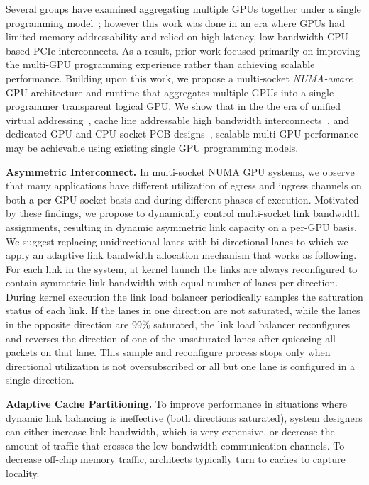 \documentclass{sig-alternate}
\begin{document}
Several groups have examined aggregating multiple GPUs together under 
a single programming model~\cite{lee2013transparent,Cabezas2015}; however this 
work was done in an era where GPUs had limited memory addressability and relied 
on high latency, low bandwidth CPU-based PCIe interconnects. As a result, prior work focused primarily on improving the multi-GPU programming experience rather than achieving scalable performance. Building upon this work, we propose a 
multi-socket \textit{NUMA-aware} GPU architecture and runtime that aggregates 
multiple GPUs into a single programmer transparent logical GPU. We show that in 
the the era of unified virtual addressing~\cite{UVM}, cache line addressable 
high bandwidth interconnects~\cite{NVLINK}, and dedicated GPU and CPU socket PCB 
designs~\cite{SierraHPC}, scalable multi-GPU performance may be achievable using 
existing single GPU programming models.


\textbf{Asymmetric Interconnect.} In multi-socket NUMA GPU systems, we observe that many applications have different utilization of egress and ingress channels on both a per GPU-socket basis and during different phases of execution. Motivated by these findings, we propose to dynamically control multi-socket link bandwidth assignments, resulting in dynamic asymmetric link capacity on a per-GPU basis. We suggest replacing unidirectional lanes with bi-directional lanes to which we apply an adaptive link bandwidth allocation mechanism that works as following. For each link in the system, at kernel launch the links are always reconfigured to contain symmetric link bandwidth with equal number of lanes per direction. During kernel execution the link load balancer periodically samples the saturation status of each link. If the lanes in one direction are not saturated, while the lanes in the opposite direction are 99\% saturated, the link load balancer reconfigures and reverses the direction of one of the unsaturated lanes after quiescing all packets on that lane. This sample and reconfigure process stops only when directional utilization is not oversubscribed or all but one lane is configured in a single direction.



\textbf{Adaptive Cache Partitioning.} To improve performance in situations where dynamic link balancing is ineffective (both directions saturated), system designers can either increase link bandwidth, which is very expensive, or decrease the amount of traffic that crosses the low bandwidth communication channels. To decrease off-chip memory traffic, architects typically turn to caches
to capture locality.
\end{document}
